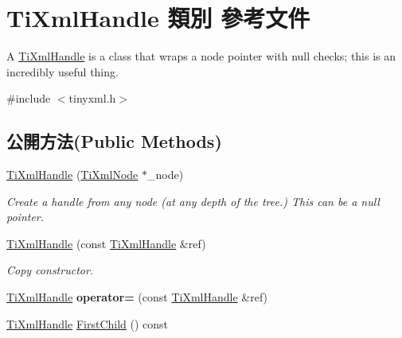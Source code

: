 \hypertarget{class_ti_xml_handle}{}\section{Ti\+Xml\+Handle 類別 參考文件}
\label{class_ti_xml_handle}


A \hyperlink{class_ti_xml_handle}{Ti\+Xml\+Handle} is a class that wraps a node pointer with null checks; this is an incredibly useful thing.  




{\ttfamily \#include $<$tinyxml.\+h$>$}

\subsection*{公開方法(Public Methods)}
\begin{DoxyCompactItemize}
\item 
\hyperlink{class_ti_xml_handle_aba18fd7bdefb942ecdea4bf4b8e29ec8}{Ti\+Xml\+Handle} (\hyperlink{class_ti_xml_node}{Ti\+Xml\+Node} $\ast$\+\_\+node)\hypertarget{class_ti_xml_handle_aba18fd7bdefb942ecdea4bf4b8e29ec8}{}\label{class_ti_xml_handle_aba18fd7bdefb942ecdea4bf4b8e29ec8}

\begin{DoxyCompactList}\small\item\em Create a handle from any node (at any depth of the tree.) This can be a null pointer. \end{DoxyCompactList}\item 
\hyperlink{class_ti_xml_handle_a236d7855e1e56ccc7b980630c48c7fd7}{Ti\+Xml\+Handle} (const \hyperlink{class_ti_xml_handle}{Ti\+Xml\+Handle} \&ref)\hypertarget{class_ti_xml_handle_a236d7855e1e56ccc7b980630c48c7fd7}{}\label{class_ti_xml_handle_a236d7855e1e56ccc7b980630c48c7fd7}

\begin{DoxyCompactList}\small\item\em Copy constructor. \end{DoxyCompactList}\item 
\hyperlink{class_ti_xml_handle}{Ti\+Xml\+Handle} {\bfseries operator=} (const \hyperlink{class_ti_xml_handle}{Ti\+Xml\+Handle} \&ref)\hypertarget{class_ti_xml_handle_ad8e5dcf6a87882674203157f29f8e4db}{}\label{class_ti_xml_handle_ad8e5dcf6a87882674203157f29f8e4db}

\item 
\hyperlink{class_ti_xml_handle}{Ti\+Xml\+Handle} \hyperlink{class_ti_xml_handle_acdb1faaf88a700b40ca2c8d9aee21139}{First\+Child} () const \hypertarget{class_ti_xml_handle_acdb1faaf88a700b40ca2c8d9aee21139}{}\label{class_ti_xml_handle_acdb1faaf88a700b40ca2c8d9aee21139}


\end{DoxyCompactItemize}
